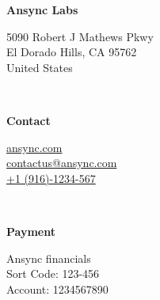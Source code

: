 \begin{minipage}[t]{0.3\textwidth}
	\itshape %
	
	\textbf{Ansync Labs} %
	
	5090 Robert J Mathews Pkwy \\ %
	El Dorado Hills, CA 95762 \\
	United States \\
\end{minipage}
\begin{minipage}[t]{0.03\textwidth}
	~ %
\end{minipage}
\begin{minipage}[t]{0.3\textwidth}
	\itshape %
	
	\textbf{Contact}
	
	\href{https://ansync.com}{ansync.com} \\ %
	\href{mailto:contactus@ansync.com}{contactus@ansync.com} \\
	\href{+1(916)-1234-567}{+1 (916)-1234-567}\\
\end{minipage}
\begin{minipage}[t]{0.03\textwidth}
	~ %
\end{minipage}
\begin{minipage}[t]{0.3\textwidth}
	\itshape %
	
	\textbf{Payment}
	
	Ansync financials \\ %
	Sort Code: 123-456 \\
	Account: 1234567890 \\
\end{minipage}



